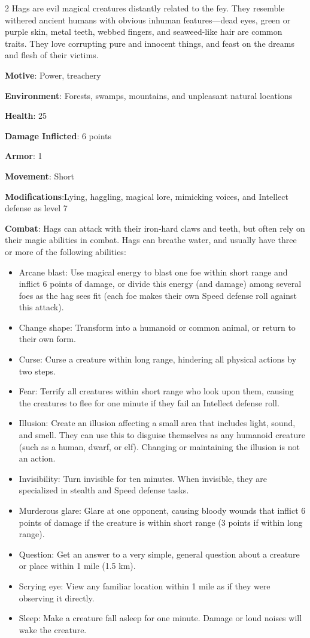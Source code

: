\begin{multicols}{2}
Hags are evil magical creatures distantly related to the fey. They resemble withered ancient humans with obvious inhuman features—dead eyes, green or purple skin, metal teeth, webbed fingers, and seaweed-like hair are common traits. They love corrupting pure and innocent things, and feast on the dreams and flesh of their victims. 

\textbf{Motive}: Power, treachery 

\textbf{Environment}: Forests, swamps, mountains, and unpleasant natural locations 

\textbf{Health}: 25 

\textbf{Damage Inflicted}: 6 points 

\textbf{Armor}: 1 

\textbf{Movement}: Short 

\textbf{Modifications}:Lying, haggling, magical lore, mimicking voices, and Intellect defense as level 7 

\textbf{Combat}: Hags can attack with their iron-hard claws and teeth, but often rely on their magic abilities in combat. Hags can breathe water, and usually have three or more of the following abilities: 

\begin{itemize}
\item Arcane blast: Use magical energy to blast one foe within short range and inflict 6 points of damage, or divide this energy (and damage) among several foes as the hag sees fit (each foe makes their own Speed defense roll against this attack). 
\item Change shape: Transform into a humanoid or common animal, or return to their own form. 
\item Curse: Curse a creature within long range, hindering all physical actions by two steps. 
\item Fear: Terrify all creatures within short range who look upon them, causing the creatures to flee for one minute if they fail an Intellect defense roll. 
\item Illusion: Create an illusion affecting a small area that includes light, sound, and smell. They can use this to disguise themselves as any humanoid creature (such as a human, dwarf, or elf). Changing or maintaining the illusion is not an action. 
\item Invisibility: Turn invisible for ten minutes. When invisible, they are specialized in stealth and Speed defense tasks. 
\item Murderous glare: Glare at one opponent, causing bloody wounds that inflict 6 points of damage if the creature is within short range (3 points if within long range). 
\item Question: Get an answer to a very simple, general question about a creature or place within 1 mile (1.5 km). 
\item Scrying eye: View any familiar location within 1 mile as if they were observing it directly. 
\item Sleep: Make a creature fall asleep for one minute. Damage or loud noises will wake the creature. 
\end{itemize}


\end{multicols}
